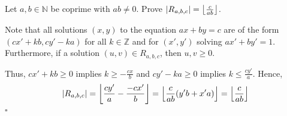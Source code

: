 \documentclass{article}
\newcommand{\N}{\mathbb{N}}
\newcommand{\Z}{\mathbb{Z}}
\DeclarePairedDelimiter\floor{\lfloor}{\rfloor}
\begin{document}
\subsection{} %
  Let $a,b\in\N$ be coprime with $ab\ne0$. Prove $|R_{a,b,c}|=\floor*{
  \frac{c}{ab}}$.

  Note that all solutions $(x,y)$ to the equation $ax+by=c$ are of the form
  $(cx'+kb,cy'-ka)$ for all $k\in\Z$ and for $(x',y')$ solving $ax'+by'=1$.
  Furthermore, if a solution $(u,v)\in R_{a,b,c}$, then $u,v\geq0$.

  Thus, $cx'+kb\geq0$ implies $k\geq-\frac{cx}{b}$ and $cy'-ka\geq0$ implies $k
  \leq\frac{cy'}{a}$. Hence,
  \begin{align*}
    |R_{a,b,c}| = \floor*{\frac{cy'}{a}-\frac{-cx'}{b}}
                = \floor*{\frac{c}{ab}(y'b+x'a)}
                = \floor*{\frac{c}{ab}}
  \end{align*}
  \hfill $\square$

\subsection{} %
\end{document}
